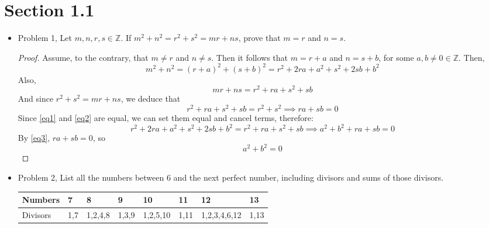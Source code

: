 \documentclass[hidelinks,12pt]{article}
\title{\scalebox{2}{Math 531 Homework 1}}
\author{\scalebox{1.5}{Theo Koss}}
\date{January 2021}
\newcommand{\Z}{\mathbb{Z}}
\begin{document}
\maketitle
\section{Section 1.1}
\begin{itemize}
    \item Problem 1, Let $m,n,r,s\in\Z$. If $m^2+n^2=r^2+s^2=mr+ns$, prove that $m=r$ and $n=s$.
    \begin{proof}
    Assume, to the contrary, that $m\neq r$ and $n\neq s$. Then it follows that $m=r+a$ and $n=s+b$, for some $a,b\neq0\in\Z$. Then,\begin{equation}\label{eq1}
        m^2+n^2=(r+a)^2+(s+b)^2=r^2+2ra+a^2+s^2+2sb+b^2
    \end{equation}Also,\begin{equation}\label{eq2}
        mr+ns=r^2+ra+s^2+sb
    \end{equation}And since $r^2+s^2=mr+ns$, we deduce that\begin{equation}\label{eq3}
        r^2+ra+s^2+sb=r^2+s^2\implies ra+sb=0
    \end{equation}
    Since \ref{eq1} and \ref{eq2} are equal, we can set them equal and cancel terms, therefore:\begin{equation}\label{eq4}
        r^2+2ra+a^2+s^2+2sb+b^2=r^2+ra+s^2+sb\implies a^2+b^2+ra+sb=0
    \end{equation}
    By \ref{eq3}, $ra+sb=0$, so $$a^2+b^2=0$$\scalebox{1.5}{\Lightning}
    \end{proof}
    \item Problem 2, List all the numbers between 6 and the next perfect number, including divisors and sums of those divisors.
\begin{table}[h]
\begin{tabular}{|l|l|l|l|l|l|l|l|}
\hline
\rowcolor[HTML]{CBCEFB} 
Numbers                           & 7                            & 8                                         & 9                              & 10                                & 11                               & 12                                    & 13       \\ \hline
\rowcolor[HTML]{9AFF99} 
Divisors                          & 1,7                          & 1,2,4,8                                   & 1,3,9                          & 1,2,5,10                          & 1,11                             & 1,2,3,4,6,12                          & 1,13     \\ \hline

\end{tabular}
\end{table}
\end{itemize}
\end{document}
